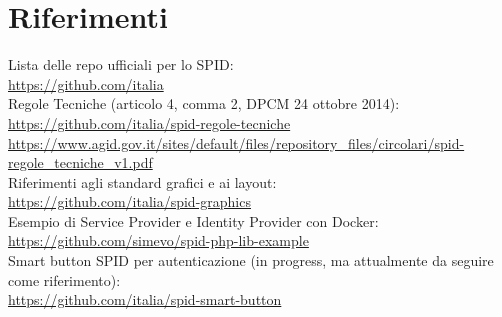 \section{Riferimenti}
Lista delle repo ufficiali per lo SPID:
\\ \url{https://github.com/italia}
\\ Regole Tecniche (articolo 4, comma 2, DPCM 24 ottobre 2014):
\\ \url{https://github.com/italia/spid-regole-tecniche}
\\ \url{https://www.agid.gov.it/sites/default/files/repository_files/circolari/spid-regole_tecniche_v1.pdf}
\\ Riferimenti agli standard grafici e ai layout:
\\ \url{https://github.com/italia/spid-graphics}
\\ Esempio di Service Provider e Identity Provider con Docker:
\\ \url{https://github.com/simevo/spid-php-lib-example}
\\ Smart button SPID per autenticazione (in progress, ma attualmente da seguire come riferimento):
\\ \url{https://github.com/italia/spid-smart-button}

